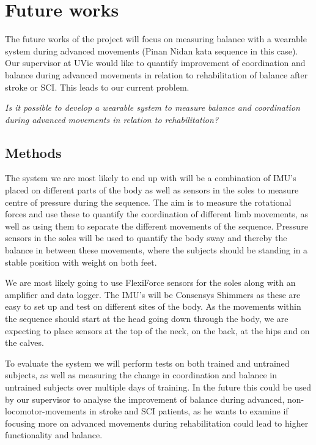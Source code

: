 \section{Future works}

The future works of the project will focus on measuring balance with a wearable system during advanced movements (Pinan Nidan kata sequence in this case). Our supervisor at UVic would like to quantify improvement of coordination and balance during advanced movements in relation to rehabilitation of balance after stroke or SCI. This leads to our current problem. 

\textit{Is it possible to develop a wearable system to measure balance and coordination during advanced movements in relation to rehabilitation?}

\subsection{Methods}

The system we are most likely to end up with will be a combination of IMU's placed on different parts of the body as well as sensors in the soles to measure centre of pressure during the sequence. The aim is to measure the rotational forces and use these to quantify the coordination of different limb movements, as well as using them to separate the different movements of the sequence. Pressure sensors in the soles will be used to quantify the body sway and thereby the balance in between these movements, where the subjects should be standing in a stable position with weight on both feet. 

We are most likely going to use FlexiForce sensors for the soles along with an amplifier and data logger. The IMU's will be Consensys Shimmers as these are easy to set up and test on different sites of the body. As the movements within the sequence should start at the head going down through the body, we are expecting to place sensors at the top of the neck, on the back, at the hips and on the calves. 

To evaluate the system we will perform tests on both trained and untrained subjects, as well as measuring the change in coordination and balance in untrained subjects over multiple days of training. In the future this could be used by our supervisor to analyse the improvement of balance during advanced, non-locomotor-movements in stroke and SCI patients, as he wants to examine if focusing more on advanced movements during rehabilitation could lead to higher functionality and balance. 